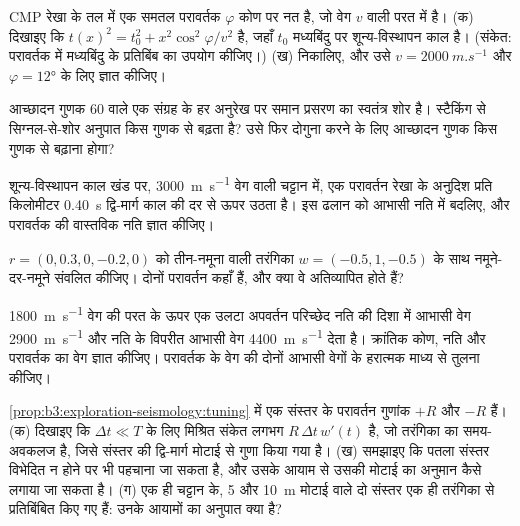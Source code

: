 \begin{exercise}[$\star\star$]\label{exo:b3:exploration-seismology:6}
CMP रेखा के तल में एक समतल परावर्तक $\varphi$ कोण पर नत है, जो
वेग $v$ वाली परत में है। (क) दिखाइए कि $t(x)^2 = t_0^2 + x^2\cos^2\varphi/v^2$ है, जहाँ $t_0$
मध्यबिंदु पर शून्य-विस्थापन काल है। (संकेत: परावर्तक में मध्यबिंदु के
प्रतिबिंब का उपयोग कीजिए।) (ख)  निकालिए, और उसे
$v = \qty{2000}{m.s^{-1}}$ और $\varphi = \ang{12}$ के लिए ज्ञात कीजिए।
\end{exercise}

\begin{exercise}[$\star\star$]\label{exo:b3:exploration-seismology:7}
आच्छादन गुणक 60 वाले एक संग्रह के हर अनुरेख पर समान प्रसरण का स्वतंत्र शोर है। स्टैकिंग से
सिग्नल-से-शोर अनुपात किस गुणक से बढ़ता है? उसे फिर दोगुना करने के लिए आच्छादन गुणक किस गुणक से
बढ़ाना होगा?
\end{exercise}

\begin{exercise}[$\star\star$]\label{exo:b3:exploration-seismology:8}
शून्य-विस्थापन काल खंड पर, \qty{3000}{m.s^{-1}} वेग वाली चट्टान में, एक परावर्तन
रेखा के अनुदिश प्रति किलोमीटर \qty{0.40}{s} द्वि-मार्ग काल की दर से ऊपर उठता है। इस ढलान को
आभासी नति में बदलिए, और परावर्तक की वास्तविक नति ज्ञात कीजिए।
\end{exercise}

\begin{exercise}[$\star\star$]\label{exo:b3:exploration-seismology:9}
 $r = (0, 0.3, 0, -0.2, 0)$ को
तीन-नमूना वाली तरंगिका $w = (-0.5, 1, -0.5)$ के साथ नमूने-दर-नमूने संवलित कीजिए। दोनों
परावर्तन कहाँ हैं, और क्या वे अतिव्यापित होते हैं?
\end{exercise}

\begin{exercise}[$\star\star\star$]\label{exo:b3:exploration-seismology:10}
\qty{1800}{m.s^{-1}} वेग की परत के ऊपर एक उलटा अपवर्तन परिच्छेद
नति की दिशा में आभासी वेग \qty{2900}{m.s^{-1}} और नति के विपरीत आभासी वेग
\qty{4400}{m.s^{-1}} देता है। क्रांतिक कोण, नति और परावर्तक का
वेग ज्ञात कीजिए। परावर्तक के वेग की
दोनों आभासी वेगों के हरात्मक माध्य से तुलना कीजिए।
\end{exercise}

\begin{exercise}[$\star\star\star$]\label{exo:b3:exploration-seismology:11}
\cref{prop:b3:exploration-seismology:tuning} में एक संस्तर के परावर्तन गुणांक
$+R$ और $-R$ हैं। (क) दिखाइए कि $\Delta t \ll T$ के लिए मिश्रित संकेत
लगभग $R\,\Delta t\,w'(t)$ है, जो तरंगिका का समय-अवकलज है,
जिसे संस्तर की द्वि-मार्ग मोटाई से गुणा किया गया है। (ख) समझाइए कि पतला संस्तर
विभेदित न होने पर भी पहचाना जा सकता है, और उसके आयाम से उसकी मोटाई का अनुमान कैसे लगाया जा सकता है।
(ग) एक ही चट्टान के, 5 और \qty{10}{m} मोटाई वाले दो संस्तर एक ही तरंगिका से
प्रतिबिंबित किए गए हैं: उनके आयामों का अनुपात क्या है?
\end{exercise}

